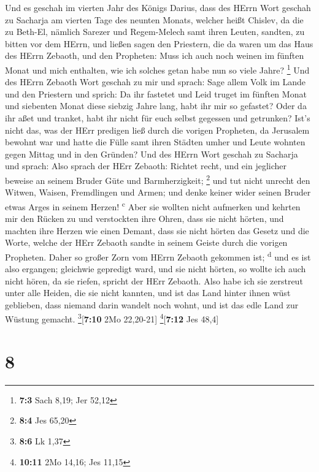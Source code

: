  Und es geschah im vierten Jahr des Königs Darius, dass
des HErrn Wort geschah zu Sacharja am vierten Tage des neunten Monats,
welcher heißt Chislev,  da die zu Beth-El, nämlich Sarezer
und Regem-Melech samt ihren Leuten, sandten, zu bitten vor dem HErrn,
 und ließen sagen den Priestern, die da waren um das Haus
des HErrn Zebaoth, und den Propheten: Muss ich auch noch weinen im
fünften Monat und mich enthalten, wie ich solches getan habe nun so
viele Jahre? \footnote{\textbf{7:3} Sach 8,19; Jer 52,12} 
Und des HErrn Zebaoth Wort geschah zu mir und sprach: 
Sage allem Volk im Lande und den Priestern und sprich: Da ihr fastetet
und Leid truget im fünften Monat und siebenten Monat diese siebzig Jahre
lang, habt ihr mir so gefastet?  Oder da ihr aßet und
tranket, habt ihr nicht für euch selbst gegessen und getrunken?
 Ist's nicht das, was der HErr predigen ließ durch die
vorigen Propheten, da Jerusalem bewohnt war und hatte die Fülle samt
ihren Städten umher und Leute wohnten gegen Mittag und in den Gründen?
 Und des HErrn Wort geschah zu Sacharja und sprach:
 Also sprach der HErr Zebaoth: Richtet recht, und ein
jeglicher beweise an seinem Bruder Güte und Barmherzigkeit; \footnote{\textbf{8:4}
  Jes 65,20}  und tut nicht unrecht den Witwen, Waisen,
Fremdlingen und Armen; und denke keiner wider seinen Bruder etwas Arges
in seinem Herzen! \textsuperscript{c}  Aber sie wollten
nicht aufmerken und kehrten mir den Rücken zu und verstockten ihre
Ohren, dass sie nicht hörten,  und machten ihre Herzen
wie einen Demant, dass sie nicht hörten das Gesetz und die Worte, welche
der HErr Zebaoth sandte in seinem Geiste durch die vorigen Propheten.
Daher so großer Zorn vom HErrn Zebaoth gekommen ist; \textsuperscript{d}
 und es ist also ergangen; gleichwie gepredigt ward, und
sie nicht hörten, so wollte ich auch nicht hören, da sie riefen, spricht
der HErr Zebaoth.  Also habe ich sie zerstreut unter alle
Heiden, die sie nicht kannten, und ist das Land hinter ihnen wüst
geblieben, dass niemand darin wandelt noch wohnt, und ist das edle Land
zur Wüstung gemacht. \footnote{\textbf{8:6} Lk 1,37}{[}\textbf{7:10} 2Mo
22,20-21{]} \footnote{\textbf{10:11} 2Mo 14,16; Jes 11,15}{[}\textbf{7:12}
Jes 48,4{]}

\hypertarget{section-7}{%
\section{8}\label{section-7}}

